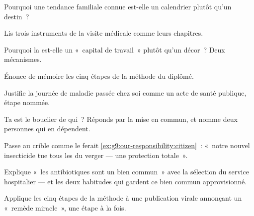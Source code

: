 \begin{exercise}[$\star$]\label{exo:g9:our-responsibility:3}
Pourquoi une tendance familiale connue est-elle un
calendrier plutôt qu'un destin~?
\end{exercise}

\begin{exercise}[$\star$]\label{exo:g9:our-responsibility:4}
Lis trois instruments de la visite médicale comme leurs
chapitres.
\end{exercise}

\begin{exercise}[$\star$]\label{exo:g9:our-responsibility:5}
Pourquoi la  est-elle un «~capital de travail~»
plutôt qu'un décor~? Deux mécanismes.
\end{exercise}

\begin{exercise}[$\star$]\label{exo:g9:our-responsibility:6}
Énonce de mémoire les cinq étapes de la méthode du diplômé.
\end{exercise}

\begin{exercise}[$\star\star$]\label{exo:g9:our-responsibility:7}
Justifie la journée de maladie passée chez soi comme un
acte de santé publique, étape nommée.
\end{exercise}

\begin{exercise}[$\star\star$]\label{exo:g9:our-responsibility:8}
Ta  est le bouclier de qui~? Réponds par la mise
en commun, et nomme deux personnes qui en dépendent.
\end{exercise}

\begin{exercise}[$\star\star$]\label{exo:g9:our-responsibility:9}
Passe au crible comme le ferait
\cref{ex:g9:our-responsibility:citizen}~: «~notre nouvel
insecticide tue tous les  du verger --- une
protection totale~».
\end{exercise}

\begin{exercise}[$\star\star$]\label{exo:g9:our-responsibility:10}
Explique «~les antibiotiques sont un bien commun~» avec la
sélection du service hospitalier --- et les deux habitudes
qui gardent ce bien commun approvisionné.
\end{exercise}

\begin{exercise}[$\star\star$]\label{exo:g9:our-responsibility:11}
Applique les cinq étapes de la méthode à une publication
virale annonçant un «~remède miracle~», une étape à la fois.
\end{exercise}

